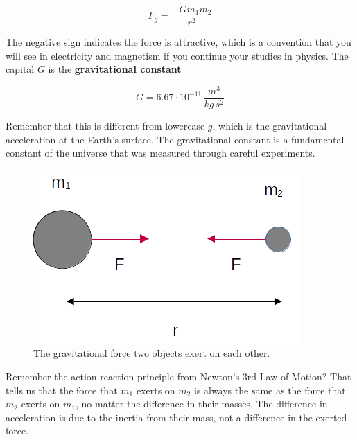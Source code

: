 \documentclass[12pt]{book}
\begin{document}
\begin{equation}
F_g = \frac{-G m_1 m_2}{r^2}
\end{equation}

The negative sign indicates the force is attractive, which is a convention that you will see in electricity and magnetism if you continue your studies in physics. The capital $G$ is the \textbf{gravitational constant}

\begin{equation}
G = 6.67 \cdot 10^{-11} \, \frac{m^3}{kg \, s^2}
\end{equation}

Remember that this is different from lowercase $g$, which is the gravitational acceleration at the Earth's surface. The gravitational constant is a fundamental constant of the universe that was measured through careful experiments.

\begin{figure}[h]
\centering
\includegraphics[scale=0.6]{gravity_diagram.png}
\caption{The gravitational force two objects exert on each other.}
\label{gravdiagram}
\end{figure}

Remember the action-reaction principle from Newton's 3rd Law of Motion? That tells us that the force that $m_1$ exerts on $m_2$ is always the same as the force that $m_2$ exerts on $m_1$, no matter the difference in their masses. The difference in acceleration is due to the inertia from their mass, not a difference in the exerted force.
\end{document}
